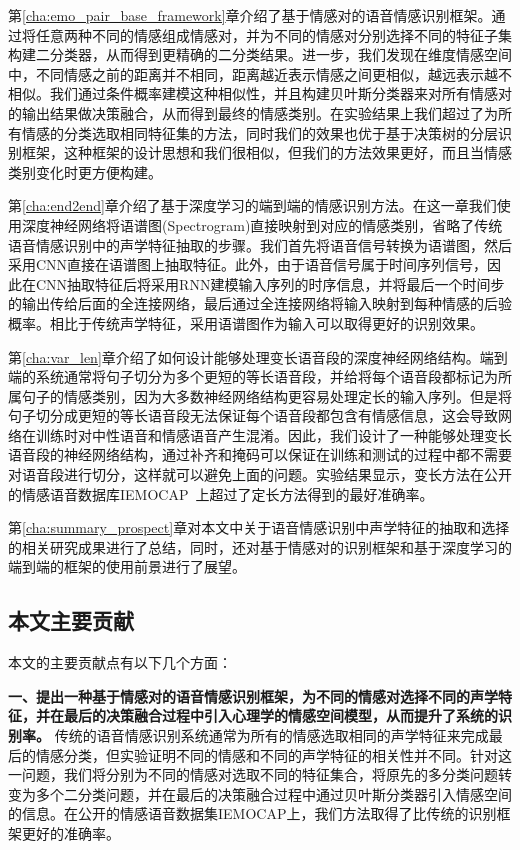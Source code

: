  第\ref{cha:emo_pair_base_framework}章介绍了基于情感对的语音情感识别框架。通过将任意两种不同的情感组成情感对，并为不同的情感对分别选择不同的特征子集构建二分类器，从而得到更精确的二分类结果。进一步，我们发现在维度情感空间中，不同情感之前的距离并不相同，距离越近表示情感之间更相似，越远表示越不相似。我们通过条件概率建模这种相似性，并且构建贝叶斯分类器来对所有情感对的输出结果做决策融合，从而得到最终的情感类别。在实验结果上我们超过了为所有情感的分类选取相同特征集的方法，同时我们的效果也优于基于决策树的分层识别框架，这种框架的设计思想和我们很相似，但我们的方法效果更好，而且当情感类别变化时更方便构建。

 第\ref{cha:end2end}章介绍了基于深度学习的端到端的情感识别方法。在这一章我们使用深度神经网络将语谱图(Spectrogram)直接映射到对应的情感类别，省略了传统语音情感识别中的声学特征抽取的步骤。我们首先将语音信号转换为语谱图，然后采用CNN直接在语谱图上抽取特征。此外，由于语音信号属于时间序列信号，因此在CNN抽取特征后将采用RNN建模输入序列的时序信息，并将最后一个时间步的输出传给后面的全连接网络，最后通过全连接网络将输入映射到每种情感的后验概率。相比于传统声学特征，采用语谱图作为输入可以取得更好的识别效果。
 
 第\ref{cha:var_len}章介绍了如何设计能够处理变长语音段的深度神经网络结构。端到端的系统通常将句子切分为多个更短的等长语音段，并给将每个语音段都标记为所属句子的情感类别，因为大多数神经网络结构更容易处理定长的输入序列。但是将句子切分成更短的等长语音段无法保证每个语音段都包含有情感信息，这会导致网络在训练时对中性语音和情感语音产生混淆。因此，我们设计了一种能够处理变长语音段的神经网络结构，通过补齐和掩码可以保证在训练和测试的过程中都不需要对语音段进行切分，这样就可以避免上面的问题。实验结果显示，变长方法在公开的情感语音数据库IEMOCAP~\cite{Busso2008IEMOCAP}上超过了定长方法得到的最好准确率。

 第\ref{cha:summary_prospect}章对本文中关于语音情感识别中声学特征的抽取和选择的相关研究成果进行了总结，同时，还对基于情感对的识别框架和基于深度学习的端到端的框架的使用前景进行了展望。

\subsection{本文主要贡献}
\label{ssec:contribution}
本文的主要贡献点有以下几个方面：

\textbf{一、提出一种基于情感对的语音情感识别框架，为不同的情感对选择不同的声学特征，并在最后的决策融合过程中引入心理学的情感空间模型，从而提升了系统的识别率。} 传统的语音情感识别系统通常为所有的情感选取相同的声学特征来完成最后的情感分类，但实验证明不同的情感和不同的声学特征的相关性并不同。针对这一问题，我们将分别为不同的情感对选取不同的特征集合，将原先的多分类问题转变为多个二分类问题，并在最后的决策融合过程中通过贝叶斯分类器引入情感空间的信息。在公开的情感语音数据集IEMOCAP上，我们方法取得了比传统的识别框架更好的准确率。

